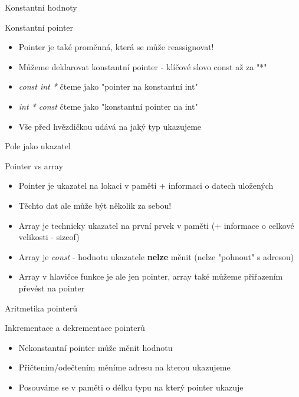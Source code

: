 \documentclass[9pt]{beamer}
\begin{document}
\begin{frame}{Konstantní hodnoty}
    \begin{block}{Konstantní pointer}
        \begin{itemize}
            \item Pointer je také proměnná, která se může reassignovat!
            \item Můžeme deklarovat konstantní pointer - klíčové slovo const až za "*"
            \item \textit{const int *} čteme jako "pointer na konstantní int"
            \item \textit{int * const} čteme jako "konstantní pointer na int"
            \item Vše před hvězdičkou udává na jaký typ ukazujeme
        \end{itemize}
    \end{block}
    
\end{frame}

\begin{frame}{Pole jako ukazatel}
    \begin{block}{Pointer vs array}
        \begin{itemize}
            \item Pointer je ukazatel na lokaci v paměti + informaci o datech uložených
            \item Těchto dat ale může být několik za sebou!
            \item Array je technicky ukazatel na první prvek v paměti (+ informace o celkové velikosti - sizeof)
            \item Array je \textit{const} - hodnotu ukazatele \textbf{nelze} měnit (nelze "pohnout" s adresou)
            \item Array v hlavičce funkce je ale jen pointer, array také můžeme přiřazením převést na pointer
        \end{itemize}
    \end{block}
\end{frame}

\begin{frame}{Aritmetika pointerů}
    \begin{block}{Inkrementace a dekrementace pointerů}
         \begin{itemize}
            \item Nekonstantní pointer může měnit hodnotu
            \item Přičtením/odečtením měníme adresu na kterou ukazujeme
            \item Posouváme se v paměti o délku typu na který pointer ukazuje
         \end{itemize}
    \end{block}
\end{frame}
\end{document}
